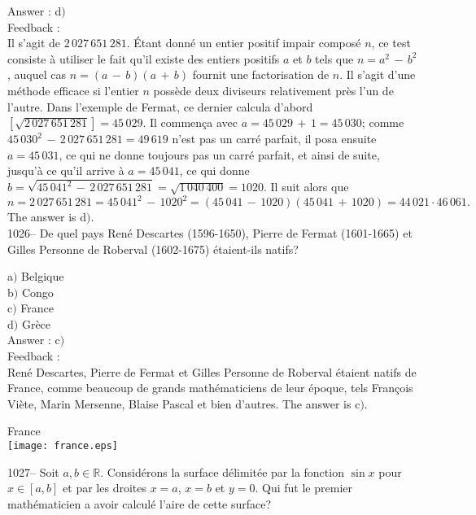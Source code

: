 ﻿\documentclass[letterpaper, 12pt]{article}
\begin{document}
Answer : d$)$\\

Feedback : \\
Il s'agit de $2\,027\,651\,281$. \'Etant donn\'e un entier positif
impair compos\'e $n$, ce test consiste \`a utiliser le fait qu'il
existe des entiers positifs $a$ et $b$ tels que $n=a^2\,-\,b^2$,
auquel cas $n=(a\,-\,b)(a\,+\,b)$ fournit une factorisation de $n$.
Il s'agit d'une m\'ethode efficace si l'entier $n$ poss\`ede deux
diviseurs relativement pr\`es l'un de l'autre. Dans l'exemple de
Fermat, ce dernier calcula d'abord $[\sqrt{
2\,027\,651\,281}]=45\,029$. Il commen\c ca avec
$a=45\,029\,+\,1=45\,030$; comme
$45\,030^2\,-\,2\,027\,651\,281=49\,619$ n'est pas un carr\'e
parfait, il posa ensuite $a=45\,031$, ce qui ne donne toujours pas
un carr\'e parfait, et ainsi de suite, jusqu'\`a ce qu'il arrive \`a
$a=45\,041$, ce qui donne
$b=\sqrt{45\,041^2\,-\,2\,027\,651\,281}=\sqrt{1\,040\,400}=1020$.
Il suit alors que
$$n=2\,027\,651\,281=45\,041^2\,-\,1020^2=(45\,041\,-\,1020)(45\,041\,+\,1020)=44\,021\cdot46\,061.$$
The answer is d$)$.\\

1026-- De quel pays Ren\'e Descartes (1596-1650), Pierre de Fermat
(1601-1665) et Gilles Personne de Roberval (1602-1675) \'etaient-ils
natifs?

a$)$ Belgique  \\
b$)$ Congo \\
c$)$ France  \\
d$)$ Gr\`ece\\

Answer : c$)$\\

Feedback :\\
Ren\'e Descartes, Pierre de Fermat et Gilles Personne de Roberval
\'etaient natifs de France, comme beaucoup de grands
math\'ematiciens de leur \'epoque, tels Fran\c cois Vi\`ete, Marin
Mersenne, Blaise Pascal et bien d'autres. The answer is c$)$.

        \begin{center}
        France\\
    \texttt{[image: france.eps]}\\
    \end{center}

1027-- Soit $a,b\in\mathbb{R}$. Consid\'erons la surface
d\'elimit\'ee par la fonction $\sin x$ pour $x\in[a,b]$ et par les
droites $x=a$, $x=b$ et $y=0$. Qui fut le premier math\'ematicien a
avoir calcul\'e l'aire de cette surface?
\end{document}
